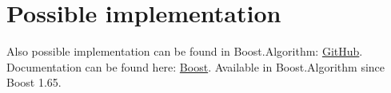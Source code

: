 \documentclass{wg21}
\begin{document}
\section{Possible implementation}
Also possible implementation can be found in Boost.Algorithm: \href{https://github.com/boostorg/algorithm/blob/master/include/boost/algorithm/is_partitioned_until.hpp}{GitHub}. Documentation can be found here: \href{https://www.boost.org/doc/libs/1_70_0/libs/algorithm/doc/html/the_boost_algorithm_library/Misc/is_partitioned_until.html}{Boost}. Available in Boost.Algorithm since Boost 1.65.
\end{document}
